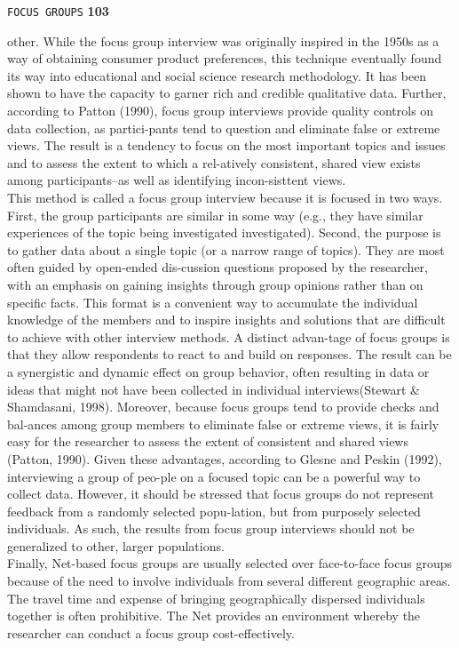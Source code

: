 \documentclass{book}
\begin{document}
\begin{flushright}
 \texttt{FOCUS GROUPS} \hspace*{1cm} \textbf{103}
\end{flushright}

\vspace*{1cm}
other. While the focus group interview was originally inspired in the 1950s as a way of obtaining consumer product preferences, this technique eventually found its way into educational and social science research methodology. It has been shown to have the capacity to garner rich and credible qualitative data. Further, according to Patton (1990), focus group interviews provide quality controls on data collection, as partici-pants tend to question and eliminate false or extreme views. The result is a tendency to focus on the most important topics and issues and to assess the extent to which a rel-atively consistent, shared view exists among participants--as well as identifying incon-sisttent views.\\
\hspace*{0.5cm} This method is called a focus group interview because it is focused in two ways.
First, the group participants are similar in some way (e.g., they have similar experiences of the topic being investigated investigated). Second, the purpose is to gather data about a single topic (or a narrow range of topics). They are most often guided by open-ended dis-cussion questions proposed by  the researcher, with an emphasis on gaining insights through group opinions rather than on specific facts. This format is a convenient way to accumulate the individual knowledge of the members and to inspire insights and solutions that are difficult to achieve with other interview methods. A distinct advan-tage of focus groups is that they allow respondents to react to and build on responses. The result can be a synergistic and dynamic effect on group behavior, often resulting in data or ideas that might not have been collected in individual interviews(Stewart \& Shamdasani, 1998). Moreover, because focus groups tend to provide checks and bal-ances among group members to eliminate false or extreme views, it is fairly easy for the researcher to assess the extent of consistent and shared views (Patton, 1990). Given these advantages, according to Glesne and Peskin (1992), interviewing a group of peo-ple on a focused topic can be a powerful way to collect data. However, it should be stressed that focus groups do not represent feedback from a randomly selected popu-lation, but from purposely selected individuals. As such, the results from focus group interviews should not be generalized to other, larger populations.\\
\hspace*{0.5cm} Finally, Net-based focus groups are usually selected over face-to-face focus groups because of the need to involve individuals from several different geographic areas. The travel time and expense of bringing geographically dispersed individuals together is often prohibitive. The Net provides an environment whereby the researcher can conduct a focus group cost-effectively.\\
\end{document}
